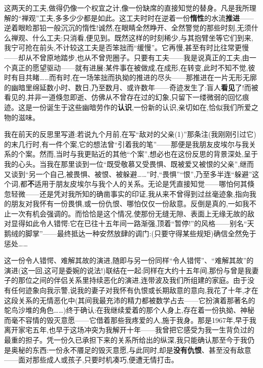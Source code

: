 这两天的工夫,做得仍像一个权宜之计,像一份缺席的直接知觉的替身。凡是我所理解的“禅观”工夫,多多少少都是如此。这工夫时时在逆着一份\textbf{惰性}的水流\textbf{推进}——逆着眼睑那铅一般沉沉的惰性!诚然,在眼睛全然睁开、全然警觉的那些时刻,无须什么禅观、什么工夫:只消看,便见到。既然这样的时刻稀少,与其抱臂坐等它们到来,我宁可抢在前头,不计较这工夫是否笨拙而“缓慢”。它再慢,甚至有时比往常更慢——却从不曾原地踏步,也从不曾兜圈子。只要有工夫——我是说真正的工夫,由一个真正的愿望驱动——就有进展:某件事在被做成,在成形,在转变,此时不知不觉,彼时有目共睹……而有时,在一场笨拙而执拗的推进的尽头——那推进在一片无形无廓的幽暗里绵延数小时、数日,乃至数月、或许数年——奇迹发生了:盲人\textbf{看见}了!而被看见的,并非一道倏忽即逝、仿佛从不曾存在过的幻象,只留下一缕微弱的回忆痕迹。这是一份诞生于这些幽暗劳作的\textbf{认识},一份新的认识,亲切如在,恰似我们所爱之物的滋味。

我在前天的反思里写道:若说九个月前,在写“敌对的父亲(1)”那条注(我刚刚引过它)的末几行时,有一件个案,它的想法曾“引着我的笔”——那便是我朋友皮埃尔与我关系的个案。然而,当时与我更贴近的其他“个案”,想必也在这份反思的背景深处,呈于我的心头。当我在那里谈到一位“既受敬慕又受畏惧、既被爱又被恨的父亲”,继而又谈到“另一个自己,被畏惧、被恨、被躲避……”时,“畏惧”“恨”,乃至多半连“躲避”这个词,都\textbf{不}适用于朋友皮埃尔与我个人的关系。无论是凭直接知觉——哪怕何其倏忽轻微——还是凭对我所知的确凿事实的印证,我从来不曾得到过丝毫迹象,指向我的朋友对我怀有一份畏惧,或一份仇恨、哪怕仅仅一份敌意。反倒是真的\dmark{},一如我不止一次有机会强调的。而恰恰是这个情况,使那份无缝无隙、表面上无缘无故的敌对显得如此令人错愕:它在已往十五年间一路渐强,顶着“暂停!”的风格——别名“天鹅绒的脚掌”——最终抵达一种安然放肆的调门:(只要守得某些规矩)确信全然免于惩处……

这一份令人错愕、难解其故的演进,随即与另一份同样“令人错愕”、“难解其故”的演进(这一回,这可是委婉的说法!)联结在一起:同样在大约十五年间,那份与曾是我妻子的那位之间的伴侣关系里持续恶化的演进,连带波及我们所组建的家庭。由于没有任何迹象向我示警,说我的妻子对我怀有仇恨或长期敌意的意向,我花了十年,才在这段关系的无情恶化中(其间我最充沛的精力都被数学占去——它扮演着那著名的鸵鸟沙堆的角色……)终于确认:在我继续爱着的那个人身上,存在着一份执拗、神秘而毫不容情的毁灭意愿——它借着那些我疼爱的人,施于我身。那是1967年,早于我离开家宅五年,也早于这场冲突为我解开十年——我曾把它感受为我一生背负过的最重的担子。凭一份久已承担下来的关系所给出的纵深,我只能确认那至今于我仍是奥秘的东西:一份永不餍足的毁灭意愿,与此同时,却是\textbf{没有仇恨}、甚至没有敌意——面对那些成人或孩子,只要时机凑巧,便遭无情打击。

